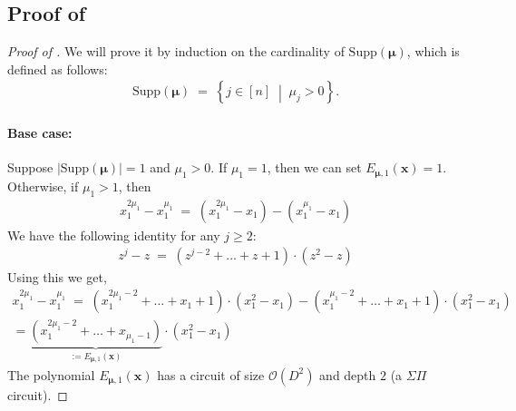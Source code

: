 \documentclass[11pt]{article}
\newcommand{\bigO}{\mathcal{O}}
\newcommand{\setcond}[2]{\left\{ #1 \;\middle\vert\; #2 \right\}}
\begin{document}
\subsection{Proof of }\label{app:proof-monomial-axioms}

\monomialaxioms*

\begin{proof}[Proof of ]
 We will prove it by induction on the cardinality of $\mathrm{Supp}(\bm{\mu})$, which is defined as follows:
 \begin{align*}
     \mathrm{Supp}(\bm{\mu}) \; = \; \setcond{j \in [n]}{\mu_{j} > 0}.
 \end{align*}
 
\paragraph{Base case:}Suppose $|\mathrm{Supp}(\bm{\mu})| = 1$ and $\mu_{1} > 0$. If $\mu_{1} = 1$, then we can set $E_{\bm{\mu},1}(\mathbf{x}) = 1$. Otherwise, if $\mu_{1} > 1$, then
\begin{align*}
    x_{1}^{2 \mu_{1}} - x_{1}^{\mu_{1}} \; = \; (x_{1}^{2 \mu_{1}} - x_{1}) - (x_{1}^{\mu_{1}} - x_{1})    
\end{align*}
We have the following identity for any $j \geq 2$:
\begin{align*}
    z^{j} - z \; = \; (z^{j-2} + \ldots + z + 1) \cdot (z^{2} - z)
\end{align*}
Using this we get,
\begin{gather*}
     x_{1}^{2 \mu_{1}} - x_{1}^{\mu_{1}} \; = \; (x_{1}^{2 \mu_{1} - 2} + \ldots + x_{1} + 1) \cdot (x_{1}^{2} - x_{1}) - (x_{1}^{\mu_{1} - 2} + \ldots + x_{1} + 1) \cdot (x_{1}^{2} - x_{1}) \\
     = \underbrace{(x_{1}^{2 \mu_{1} - 2} + \ldots + x_{\mu_{1} - 1})}_{:= E_{\bm{\mu},1}(\mathbf{x})} \cdot (x_{1}^{2} - x_{1})
\end{gather*}
The polynomial $E_{\bm{\mu},1}(\mathbf{x})$ has a circuit of size $\bigO(D^{2})$ and depth $2$ (a $\Sigma \Pi$ circuit).


\end{proof}
\end{document}
